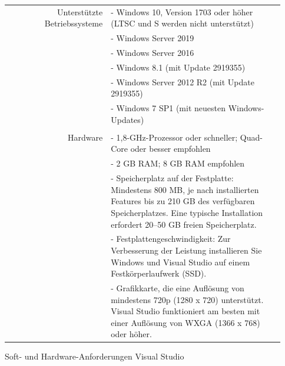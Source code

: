 \begin{figure}[H]
    \centering\begin{tabular}{ | r | p{0.6\linewidth} l | }
        \hline
        Unterstützte Betriebssysteme
        & - Windows 10, Version 1703 oder höher (LTSC und S werden nicht unterstützt)\\
        & - Windows Server 2019\\
        & - Windows Server 2016\\
        & - Windows 8.1 (mit Update 2919355)\\
        & - Windows Server 2012 R2 (mit Update 2919355)\\
        & - Windows 7 SP1 (mit neuesten Windows-Updates)\\
        & \\
        Hardware
        & - 1,8-GHz-Prozessor oder schneller; Quad-Core oder besser empfohlen\\
        & - 2 GB RAM; 8 GB RAM empfohlen\\
        & - Speicherplatz auf der Festplatte: Mindestens 800 MB, je nach installierten Features bis zu 210 GB des verfügbaren Speicherplatzes. Eine typische Installation erfordert 20–50 GB freien Speicherplatz.\\
        & - Festplattengeschwindigkeit: Zur Verbesserung der Leistung installieren Sie Windows und Visual Studio auf einem Festkörperlaufwerk (SSD).\\
        & - Grafikkarte, die eine Auflösung von mindestens 720p (1280 x 720) unterstützt. Visual Studio funktioniert am besten mit einer Auflösung von WXGA (1366 x 768) oder höher.\\
        \hline
    \end{tabular}
    \caption{Soft- und Hardware-Anforderungen Visual Studio}    
\end{figure}





